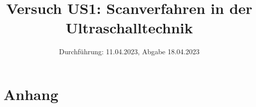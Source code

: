 

\title{Versuch US1:  Scanverfahren in der Ultraschalltechnik}
\date{Durchführung: 11.04.2023, Abgabe 18.04.2023}


\maketitle
\thispagestyle{empty} 
\tableofcontents
\newpage
\setcounter{page}{1}






\printbibliography
\newpage

\section*{Anhang}

%

